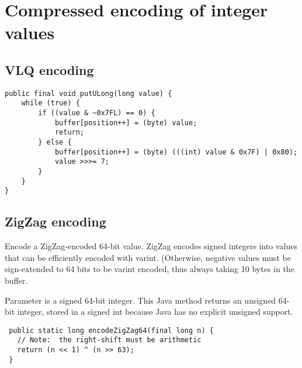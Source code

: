 \section{Compressed encoding of integer values}

\subsection{VLQ encoding}
\label{sec:vlq-encoding}

\begin{verbatim}
public final void putULong(long value) {
    while (true) {
        if ((value & ~0x7FL) == 0) {
            buffer[position++] = (byte) value;
            return;
        } else {
            buffer[position++] = (byte) (((int) value & 0x7F) | 0x80);
            value >>>= 7;
        }
    }
}
\end{verbatim}

\subsection{ZigZag encoding}
\label{sec:zigzag-encoding}

Encode a ZigZag-encoded 64-bit value.  ZigZag encodes signed integers
into values that can be efficiently encoded with varint.  (Otherwise,
negative values must be sign-extended to 64 bits to be varint encoded,
thus always taking 10 bytes in the buffer.

Parameter  is a signed 64-bit integer.
This Java method returns an unsigned 64-bit integer, stored in a signed int because Java has no explicit unsigned support.

\begin{verbatim}
 public static long encodeZigZag64(final long n) {
   // Note:  the right-shift must be arithmetic
   return (n << 1) ^ (n >> 63);
 }    
\end{verbatim}